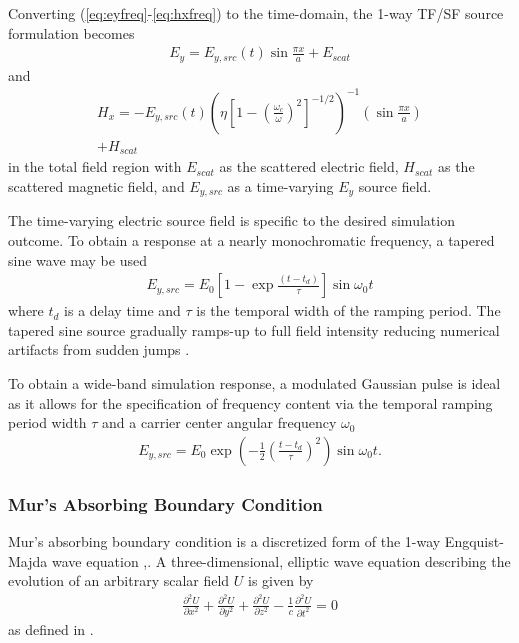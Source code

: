 Converting  (\ref{eq:eyfreq}-\ref{eq:hxfreq}) to the time-domain, the 1-way TF/SF source formulation becomes
\begin{align}
	E_y=E_{y,src}(t)\sin{\frac{\pi x}{a}} + E_{scat}
	\label{eq:tfsf-ey}
\end{align}
and
\begin{multline}
	H_x = -E_{y,src}(t)\left(\eta\left[1-\left(\frac{\omega_c}{\omega}\right)^2\right]^{-1/2}\right)^{-1}\left(\sin{\frac{\pi x}{a}}\right) \\ + H_{scat}
	\label{eq:tfsf-hx}
\end{multline}
in the total field region with $E_{scat}$ as the scattered electric field, $H_{scat}$ as the scattered magnetic field, and $E_{y,src}$ as a time-varying $E_y$ source field. 

The time-varying electric source field is specific to the desired simulation outcome. To obtain a response at a nearly monochromatic frequency, a tapered sine wave may be used 
\begin{align}
	E_{y,src} = E_0\left[1 - \exp{\frac{(t - t_d)}{\tau}}\right]\sin{\omega_0 t}
	\label{eq:tapered-sin}
\end{align}
where $t_d$ is a delay time and $\tau$ is the temporal width of the ramping period. The tapered sine source gradually ramps-up to full field intensity reducing numerical artifacts from sudden jumps \cite{rothlecnotes}.

To obtain a wide-band simulation response, a modulated Gaussian pulse is ideal as it allows for the specification of frequency content via the temporal ramping period width $\tau$ and a carrier center angular frequency $\omega_0$ \cite{rothlecnotes}  
\begin{align}
	E_{y,src} = E_0\exp{\left(-\frac{1}{2}\left(\frac{t-t_d}{\tau}\right)^2\right)}\sin{\omega_0t}.
	\label{eq:mod-gauss}
\end{align}

\subsubsection{Mur's Absorbing Boundary Condition}
\label{subsubsec:murtheory}
Mur's absorbing boundary condition is a discretized form of the 1-way Engquist-Majda wave equation \cite{rothlecnotes},\cite{taftlovefdtd}. A three-dimensional, elliptic wave equation describing the evolution of an arbitrary scalar field $U$ is given by
\begin{align}
	\frac{\partial^2 U}{\partial x^2}+\frac{\partial^2 U}{\partial y^2}+\frac{\partial^2 U}{\partial z^2}-\frac{1}{c}\frac{\partial^2 U}{\partial t^2}=0
	\label{eq:scalarelliptic}
\end{align}
as defined in \cite{taftlovefdtd}.


